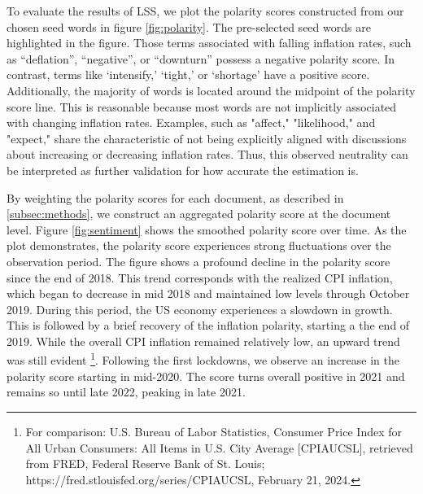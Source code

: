  To evaluate the results of \textsf{LSS}, we plot the polarity scores constructed from our chosen seed words in figure \ref{fig:polarity}. The pre-selected seed words are highlighted in the figure. Those terms associated with falling inflation rates, such as ``deflation'', ``negative'', or ``downturn'' possess a negative polarity score. In contrast, terms like ‘intensify,’ ‘tight,’ or ‘shortage’ have a positive score. Additionally, the majority of words is located around the midpoint of the polarity score line. This is reasonable because most words are not implicitly associated with changing inflation rates. Examples, such as "affect," "likelihood," and "expect," share the characteristic of not being explicitly aligned with discussions about increasing or decreasing inflation rates. Thus, this observed neutrality can be interpreted as further validation for how accurate the estimation is. 
 
By weighting the polarity scores for each document, as described in \ref{subsec:methods}, we construct an aggregated polarity score at the document level. Figure \ref{fig:sentiment} shows the smoothed polarity score over time. As the plot demonstrates, the polarity score experiences strong fluctuations over the observation period. The figure shows a profound decline in the polarity score since the end of 2018. This trend corresponds with the realized CPI inflation, which began to decrease in mid 2018 and maintained low levels through October 2019. During this period, the US economy experiences a slowdown in growth. This is followed by a brief recovery of the inflation polarity, starting a the end of 2019. While the overall CPI inflation remained relatively low, an upward trend was still evident \footnote{For comparison: U.S. Bureau of Labor Statistics, Consumer Price Index for All Urban Consumers: All Items in U.S. City Average [CPIAUCSL], retrieved from FRED, Federal Reserve Bank of St. Louis; https://fred.stlouisfed.org/series/CPIAUCSL, February 21, 2024.}. Following the first lockdowns, we observe an increase in the polarity score starting in mid-2020. The score turns overall positive in 2021 and remains so until late 2022, peaking in late 2021.

